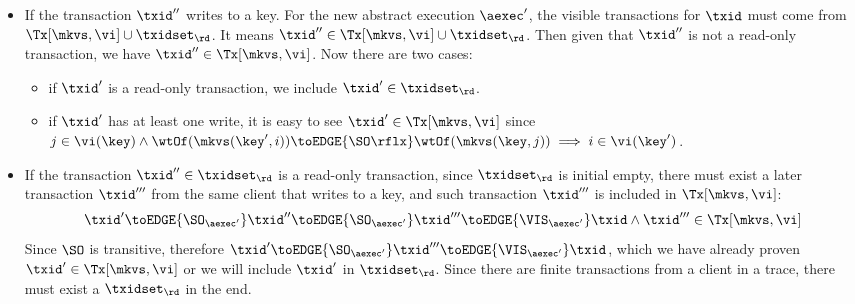 \begin{itemize}
\item If the transaction \( \txid'' \) writes to a key.
For the new abstract execution \( \aexec' \), the visible transactions for \( \txid \) must come from \( \Tx[\mkvs, \vi] \cup \txidset_\rd \).
It means \( \txid'' \in \Tx[\mkvs, \vi] \cup \txidset_\rd  \).
Then given that \( \txid'' \) is not a read-only transaction, we have \( \txid'' \in \Tx[\mkvs, \vi] \).
Now there are two cases:
\begin{itemize}
    \item if \( \txid' \) is a read-only transaction, we include \( \txid' \in \txidset_{\rd} \).
    \item if \( \txid' \) has at least one write, it is easy to see \( \txid' \in \Tx[\mkvs, \vi] \) since \( j \in \vi(\key) \land \wtOf(\mkvs(\key', i)) \toEDGE{\SO\rflx} \wtOf(\mkvs(\key, j)) \implies i \in \vi(\key') \).
\end{itemize}
\item If the transaction \( \txid'' \in \txidset_\rd \) is a read-only transaction, 
since \( \txidset_\rd \) is initial empty, there must exist a later transaction \( \txid''' \) from the same client that writes to a key,
and such transaction \( \txid''' \) is included in \( \Tx[\mkvs, \vi] \):
\[
    \txid' \toEDGE{\SO_{\aexec'}} \txid'' 
    \toEDGE{\SO_{\aexec'}} \txid''' \toEDGE{\VIS_{\aexec'}} \txid 
    \land \txid''' \in \Tx[\mkvs,\vi]
\]
Since \( \SO \) is transitive, 
therefore \( \txid' \toEDGE{\SO_{\aexec'}} \txid''' \toEDGE{\VIS_{\aexec'}} \txid \),
which we have already proven \( \txid' \in \Tx[\mkvs, \vi] \) or we will include \( \txid' \) in \( \txidset_\rd \).
Since there are finite transactions from a client in a trace, there must exist a \( \txidset_\rd \) in the end.
\end{itemize}


